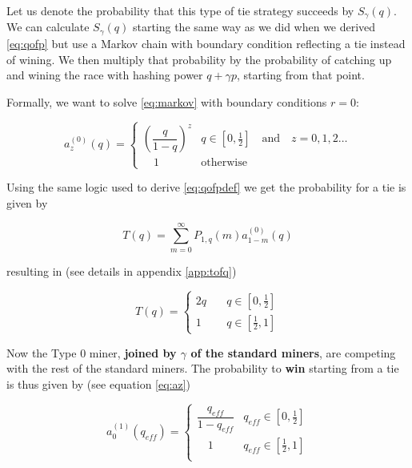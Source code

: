 \documentclass[letterpaper,12pt]{report}
\begin{document}
Let us denote the probability that this type of tie strategy succeeds by $S_{\gamma}(q)$.
We can calculate $S_{\gamma}(q)$ starting the same way as we did when we derived \ref{eq:qofp} but use a Markov chain with boundary condition reflecting a tie instead of wining. We then multiply that probability by the probability of catching up and wining the race with hashing power $q+\gamma p$, starting from that point.

Formally, we want to solve \ref{eq:markov} with boundary conditions $r=0$:

\begin{equation}\label{eq:bz}
\mathit{a}_z^{(0)}(q)=\begin{cases}\left( \dfrac{q}{1-q}\right)^z & q\in [0,\frac{1}{2}] \quad \mathrm{and} \quad z=0,1,2\dots \\ \quad 1 & \mathrm{otherwise} \end{cases}
\end{equation}

Using the same logic used to derive \ref{eq:qofpdef} we get the probability for a tie is given by

\begin{equation}\label{eq:qofpdef}
\mathit{T}(q)= \sum_{m=0}^{\infty}\mathit{P}_{1,q}(m)\mathit{a}^{(0)}_{1-m}(q)
\end{equation}

resulting in (see details in appendix \ref{app:tofq})

\begin{equation}\label{eq:qofp}
\mathit{T}(q)=
\begin{cases}
2q & \quad q \in [0,\frac{1}{2}] \\
1 & \quad q \in [\frac{1}{2},1] 
\end{cases}
\end{equation}

Now the Type 0 miner, \textbf{joined by $\gamma$ of the standard miners}, are competing with the rest of the standard miners. The probability to \textbf{win} starting from a tie is thus given by (see equation \ref{eq:az}) 

\begin{equation}\label{eq:azeroeff}
\mathit{a}^{(1)}_0(q_{eff})=\begin{cases} \dfrac{q_{eff}}{1-q_{eff}} & q_{eff}\in [0,\frac{1}{2}] \\  
\quad 1 & q_{eff}\in [\frac{1}{2},1] \\ \end{cases}
\end{equation}
\end{document}
